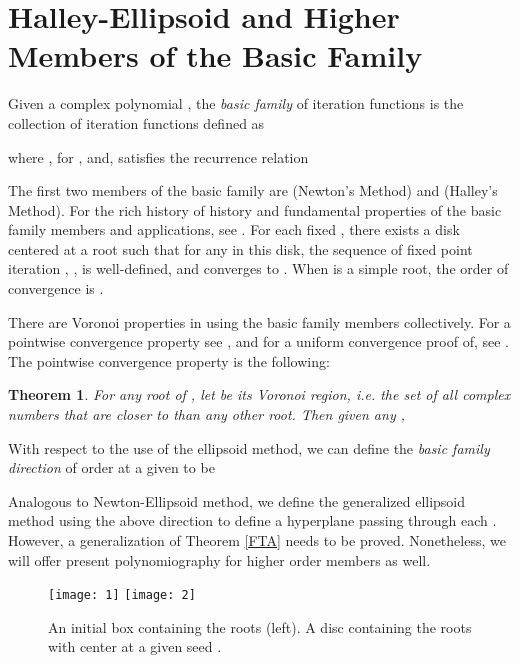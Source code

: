 \documentclass{article}
\newtheorem{theorem}{Theorem}
\begin{document}
\section{Halley-Ellipsoid and Higher Members of the Basic Family}

Given a complex polynomial , the {\it basic family} of iteration functions is the collection of iteration functions defined as

where  ,   for , and,  satisfies the recurrence relation


The first two members of the basic family are  (Newton's Method) and  (Halley's Method).  For the rich  history of history and fundamental properties of the basic family members and applications, see \cite{kalbook}.  For each fixed , there exists a disk centered at a root  such that for any  in this disk, the sequence of fixed point iteration
, , is well-defined, and converges to .  When   is a simple
root,  the order of convergence is .

There are Voronoi properties in using the basic family members collectively.  For a pointwise convergence property see \cite{kalbook}, and for a uniform convergence proof of, see \cite{KalDCG}. The pointwise convergence property is the following:

\begin{theorem} \label{thm2} For any root  of , let  be its Voronoi region, i.e. the set of all complex numbers that are closer to  than any other root. Then given any ,  
\end{theorem}

With respect to the use of the ellipsoid method, we can define the \textit{basic family direction} of order  at a given  to be


Analogous to Newton-Ellipsoid method, we define the generalized ellipsoid method using the above direction to define a hyperplane passing through each .  However, a generalization of Theorem \ref{FTA} needs to be proved. Nonetheless, we will offer present polynomiography for higher order members as well.

\begin{figure}
\begin{center}
\texttt{[image: 1]}
\texttt{[image: 2]}\\
\end{center}
\begin{center}
\caption{An initial box containing the roots (left). A disc containing the roots with center at a given seed .} \label{Fig1}
\end{center}
\end{figure}
\end{document}
